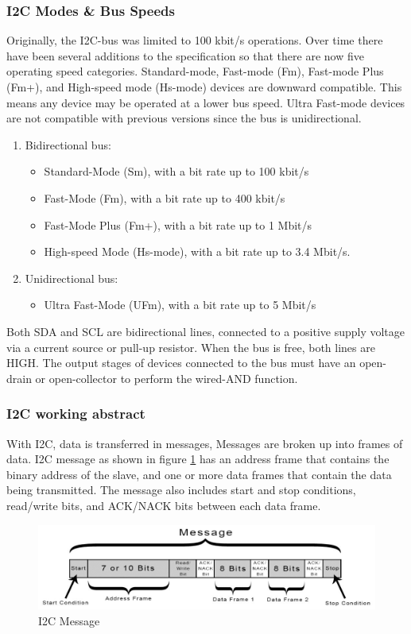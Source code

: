 \subsubsection{I2C Modes & Bus Speeds}
Originally, the I2C-bus was limited to 100 kbit/s operations. Over time there have been several additions to the specification so that there are now five operating speed categories. Standard-mode, Fast-mode (Fm), Fast-mode Plus (Fm+), and High-speed mode (Hs-mode) devices are downward compatible. This means any device may be operated at a lower bus speed. Ultra Fast-mode devices are not compatible with previous versions since the bus is unidirectional.
\begin{enumerate}
    \item Bidirectional bus:
    \begin{itemize}
        \item Standard-Mode (Sm), with a bit rate up to 100 kbit/s 
        \item Fast-Mode (Fm), with a bit rate up to 400 kbit/s
        \item Fast-Mode Plus (Fm+), with a bit rate up to 1 Mbit/s 
        \item High-speed Mode (Hs-mode), with a bit rate up to 3.4 Mbit/s. 
    \end{itemize}
    \item Unidirectional bus: 
    \begin{itemize}
        \item Ultra Fast-Mode (UFm), with a bit rate up to 5 Mbit/s 
    \end{itemize}
\end{enumerate}
Both SDA and SCL are bidirectional lines, connected to a positive supply voltage via a current source or pull-up resistor. When the bus is free, both lines are HIGH. The output stages of devices connected to the bus must have an open-drain or open-collector to perform the wired-AND function. \newline

\subsubsection{I2C working abstract}
With I2C, data is transferred in messages, Messages are broken up into frames of data. \newline
I2C message as shown in figure \ref{fig:i2c-message} has an address frame that contains the binary address of the slave, and one or more data frames that contain the data being transmitted. The message also includes start and stop conditions, read/write bits, and ACK/NACK bits between each data frame. \newline
\begin{figure}[h]
   \centering
    \includegraphics[width=.5\textwidth]{figure/3_5.jpg}
    \caption{I2C Message}
    \label{fig:i2c-message}
\end{figure}

